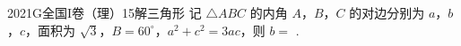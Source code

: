 
\begin{problem}{2021}{G}{全国I卷（理）}{15}{解三角形}
记 $ \triangle ABC $ 的内角 $ A $，$ B $，$ C $ 的对边分别为 $ a $，$ b $，$ c $，面积为 $ \sqrt{3} $，$ B=60^\circ $，$ a^2+c^2=3ac $，则 $ b= $ \underline{\hspace{4em}}.
\end{problem}

\begin{answer}

\end{answer}

\begin{solutions}

\end{solutions}